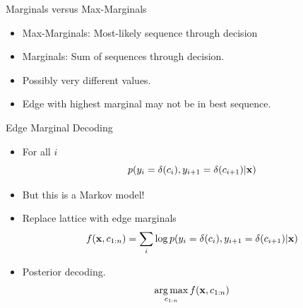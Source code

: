 \documentclass{beamer}
\begin{document}
\begin{frame}{Marginals versus Max-Marginals}
  \begin{itemize}
  \item Max-Marginals: Most-likely sequence through decision
    \air 
  \item Marginals: Sum of sequences through decision.
  \end{itemize}
  \air 

  \begin{itemize}
  \item Possibly very different values.
    \air 

  \item Edge with highest marginal may not be in best sequence.
  \end{itemize}
\end{frame}









\begin{frame}{Edge Marginal Decoding}
  \begin{itemize}
  \item   For all $i$ 
    \[  p(y_i = \delta(c_i), y_{i+1} = \delta(c_{i+1}) | \mathbf{x})   \] 
  \item But this is a Markov model! 
    \air 

  \item Replace lattice with edge marginals 
    \[f(\mathbf{x}, c_{1:n}) = \sum_{i} \log p(y_i = \delta(c_i), y_{i+1} = \delta(c_{i+1}) | \mathbf{x}) \]

  \end{itemize}

  \begin{itemize}
  \item Posterior decoding.
    \[\argmax_{c_{1:n}} f(\boldx, c_{1:n}) \]
  \end{itemize}
\end{frame}
\end{document}
